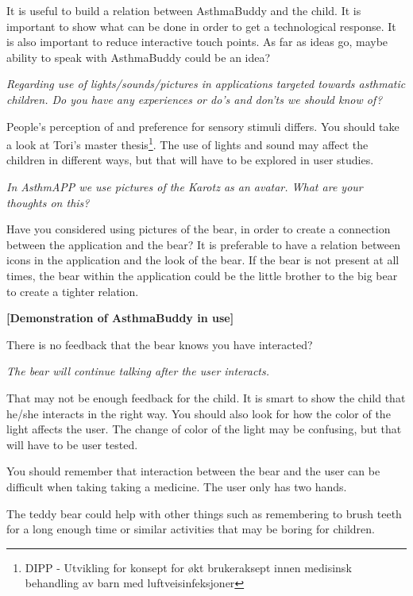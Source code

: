 It is useful to build a relation between AsthmaBuddy and the child. It is important to show what can be done in order to get a technological response. It is also important to reduce interactive touch points. As far as ideas go, maybe ability to speak with AsthmaBuddy could be an idea?

\emph{Regarding use of lights/sounds/pictures in applications targeted towards asthmatic children. Do you have any experiences or do's and don'ts we should know of?}

People's perception of and preference for sensory stimuli differs. You should take a look at Tori's master thesis\footnote{DIPP - Utvikling for konsept for \o kt brukeraksept innen medisinsk behandling av barn med luftveisinfeksjoner}. The use of lights and sound may affect the children in different ways, but that will have to be explored in user studies. 


\emph{In AsthmAPP we use pictures of the Karotz as an avatar. What are your thoughts on this?}

Have you considered using pictures of the bear, in order to create a connection between the application and the bear? It is preferable to have a relation between icons in the application and the look of the bear. If the bear is not present at all times, the bear within the application could be the little brother to the big bear to create a tighter relation. 

\textbf{[Demonstration of AsthmaBuddy in use]}

There is no feedback that the bear knows you have interacted?

\emph{The bear will continue talking after the user interacts.}

That may not be enough feedback for the child. It is smart to show the child that he/she interacts in the right way. You should also look for how the color of the light affects the user. The change of color of the light may be confusing, but that will have to be user tested. 

You should remember that interaction between the bear and the user can be difficult when taking taking a medicine. The user only has two hands. 

The teddy bear could help with other things such as remembering to brush teeth for a long enough time or similar activities that may be boring for children.

